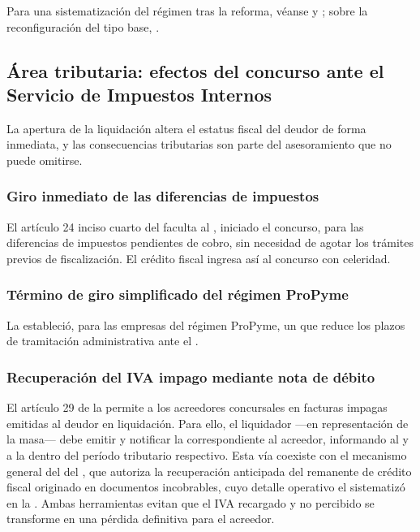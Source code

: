 Para una sistematización del régimen tras la reforma, véanse
\textcite{doc-delitos-economicos-garrigues} y \textcite{doc-delitos-economicos-prieto}; sobre la
reconfiguración del tipo base, \textcite{mayer-delitos-concursales}.

\subsection{Área tributaria: efectos del concurso ante el Servicio de Impuestos Internos}

La apertura de la liquidación altera el estatus fiscal del deudor de forma inmediata, y las
consecuencias tributarias son parte del asesoramiento que no puede omitirse.

\subsubsection{Giro inmediato de las diferencias de impuestos}

El artículo 24 inciso cuarto del \ctrib{} faculta al \sii{}, iniciado el concurso,
para  las diferencias de impuestos pendientes de cobro, sin
necesidad de agotar los trámites previos de fiscalización. El crédito fiscal ingresa así al
concurso con celeridad.

\subsubsection{Término de giro simplificado del régimen ProPyme}

La  \citeyearpar{ley-21713}
estableció, para las empresas del régimen ProPyme, un  que reduce los plazos de tramitación administrativa ante el \sii{}.

\subsubsection{Recuperación del IVA impago mediante nota de débito}

El artículo 29 de la  \citeyearpar{ley-18591} permite a los acreedores
concursales  en facturas impagas
emitidas al deudor en liquidación. Para ello, el liquidador ---en representación de la masa---
debe emitir y notificar la correspondiente  al acreedor, informando al
\sii{} y a la \tgr{} dentro del período tributario respectivo. Esta vía coexiste con el
mecanismo general del  del  \citeyearpar{dl-825}, que autoriza
la recuperación anticipada del remanente de crédito fiscal originado en documentos incobrables,
cuyo detalle operativo el \sii{} sistematizó en la \textcite{circular-sii-64-2015}. Ambas
herramientas evitan que el IVA recargado y no percibido se transforme en una pérdida definitiva
para el acreedor.

